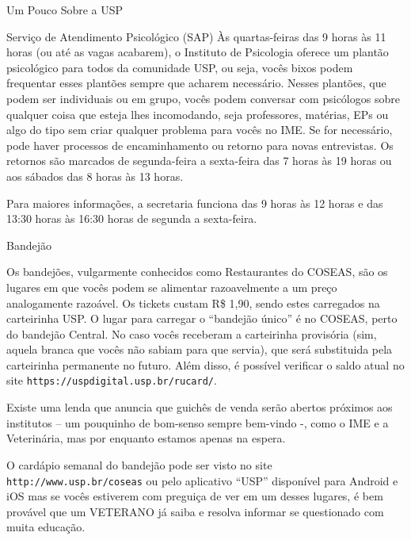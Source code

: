 \begin{secao}{Um Pouco Sobre a USP}
\begin{subsecao}{Serviço de Atendimento Psicológico (SAP)}
Às quartas-feiras das 9 horas às 11 horas (ou até as vagas acabarem),
o Instituto de Psicologia oferece um plantão psicológico para todos da
comunidade USP, ou seja, vocês bixos podem frequentar esses plantões sempre
que acharem necessário. Nesses plantões, que podem ser individuais ou em
grupo, vocês podem conversar com psicólogos sobre qualquer coisa que esteja lhes
incomodando, seja professores, matérias, EPs ou algo do tipo sem criar qualquer
problema para vocês no IME. Se for necessário, pode haver processos de
encaminhamento ou retorno para novas entrevistas. Os retornos são marcados de
segunda-feira a sexta-feira das 7 horas às 19 horas ou aos sábados das
8 horas às 13 horas.

Para maiores informações, a secretaria funciona das 9 horas às 12 horas e das
13:30 horas às 16:30 horas de segunda a sexta-feira.

\end{subsecao}
\pagebreak

\begin{subsecao}{Bandejão}


Os bandejões, vulgarmente conhecidos como Restaurantes do COSEAS, são os lugares
em que vocês podem se alimentar razoavelmente a um preço analogamente razoável.
Os tickets custam R\$ 1,90, sendo estes carregados na carteirinha USP. O
lugar para carregar o ``bandejão único'' é no COSEAS, perto do bandejão
Central. No caso vocês receberam a carteirinha provisória (sim, aquela
branca que vocês não sabiam para que servia), que será substituida pela carteirinha
permanente no futuro. Além disso, é possível verificar o saldo atual no
site {\tt https://uspdigital.usp.br/rucard/}.

Existe uma lenda que anuncia que guichês de venda serão abertos próximos aos
institutos – um pouquinho de bom-senso sempre bem-vindo -, como o IME e
a Veterinária, mas por enquanto estamos apenas na espera.

O cardápio semanal do bandejão pode ser visto no site {\tt http://www.usp.br/coseas}
ou pelo aplicativo ``USP'' disponível para Android e iOS mas se vocês estiverem
com preguiça de ver em um desses lugares, é bem provável que um VETERANO já saiba
e resolva informar se questionado com muita educação.


\end{subsecao}
\end{secao}
